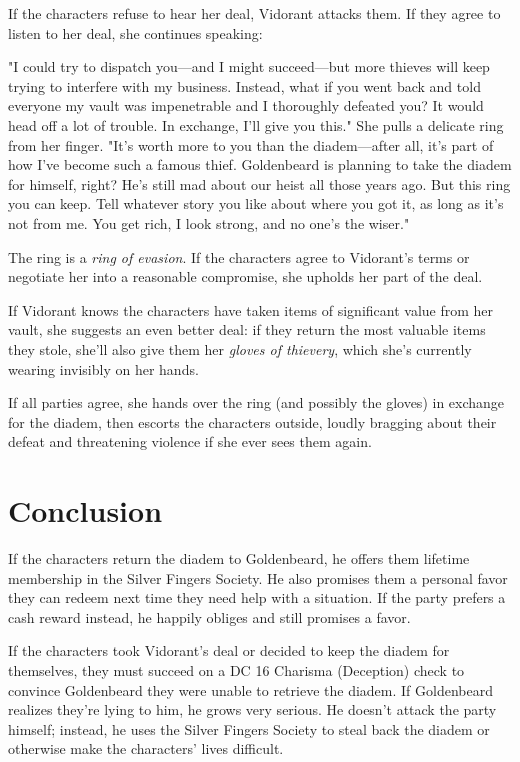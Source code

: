 \documentclass[10pt,a4paper,twoside,bg=print,twocolumn,openany,nodeprecatedcode]{dndbook}
\begin{document}
If the characters refuse to hear her deal, Vidorant attacks them. If they agree to listen to her deal, she continues speaking:

\begin{DndReadAloud}{}
"I could try to dispatch you—and I might succeed—but more thieves will keep trying to interfere with my business. Instead, what if you went back and told everyone my vault was impenetrable and I thoroughly defeated you? It would head off a lot of trouble. In exchange, I'll give you this." She pulls a delicate ring from her finger. "It's worth more to you than the diadem—after all, it's part of how I've become such a famous thief. Goldenbeard is planning to take the diadem for himself, right? He's still mad about our heist all those years ago. But this ring you can keep. Tell whatever story you like about where you got it, as long as it's not from me. You get rich, I look strong, and no one's the wiser."

\end{DndReadAloud}

The ring is a \textit{ring of evasion}. If the characters agree to Vidorant's terms or negotiate her into a reasonable compromise, she upholds her part of the deal.

If Vidorant knows the characters have taken items of significant value from her vault, she suggests an even better deal: if they return the most valuable items they stole, she'll also give them her \textit{gloves of thievery}, which she's currently wearing invisibly on her hands.

If all parties agree, she hands over the ring (and possibly the gloves) in exchange for the diadem, then escorts the characters outside, loudly bragging about their defeat and threatening violence if she ever sees them again.

\section{Conclusion}
If the characters return the diadem to Goldenbeard, he offers them lifetime membership in the Silver Fingers Society. He also promises them a personal favor they can redeem next time they need help with a situation. If the party prefers a cash reward instead, he happily obliges and still promises a favor.

If the characters took Vidorant's deal or decided to keep the diadem for themselves, they must succeed on a DC 16 Charisma (Deception) check to convince Goldenbeard they were unable to retrieve the diadem. If Goldenbeard realizes they're lying to him, he grows very serious. He doesn't attack the party himself; instead, he uses the Silver Fingers Society to steal back the diadem or otherwise make the characters' lives difficult.
\end{document}
